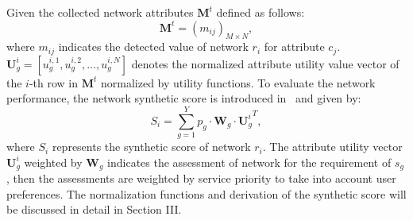 \documentclass[conference]{IEEEtran}
\begin{document}
Given the collected network attributes $\boldsymbol{M}^t$ defined as follows: 
\begin{equation}   
\label{equ05}
\boldsymbol{M}^t = {({m_{ij}})_{M \times N}}  ,
\end{equation}
where $ m_{ij}$ indicates the detected value of network $r_i$ for attribute $c_j$. 
 $\boldsymbol{U}^i_g = \left[ {u_g^{i,1},u_g^{i,2}, \ldots ,u_g^{i,N}} \right]$ denotes the normalized attribute utility  value vector of the $i$-th row in $\boldsymbol{M}^t$ normalized by utility functions.
To evaluate the network performance, the network synthetic score is introduced in~\cite{select} and given by: 
 \begin{equation}   
 \label{equ04}
 {S_i} = \sum_{g = 1}^Y {{p_g}}  \cdot \boldsymbol{W}_g \cdot {\boldsymbol{U}_g^i}^T,
 \end{equation}
where $S_i$ represents the synthetic score of network $r_i$. 
The attribute utility vector ${\boldsymbol{U}}^{i}_{g}$ 
weighted by $\boldsymbol{W}_g$ indicates the assessment of network for the requirement of $s_g$, then the assessments are weighted by service priority to take into account user preferences.
The normalization functions and derivation of the synthetic score will be discussed in detail in Section III.


    
\end{document}
